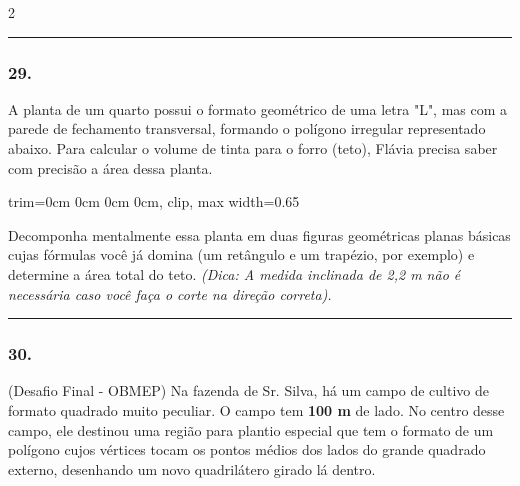 \documentclass[twoside, 10pt, a4paper]{article}
\newlength{\espacoPreQuestao}\setlength{\espacoPreQuestao}{0.1cm}
\newlength{\espacoQuestao}\setlength{\espacoQuestao}{0.2cm}
\begin{document}
\begin{multicols*}{2}
\noindent\textcolor{CorLinha}{\rule{\linewidth}{0.5pt}} 
\par\vspace{\espacoPreQuestao}
\subsubsection*{29.} A planta de um quarto possui o formato geométrico de uma letra "L", mas com a parede de fechamento transversal, formando o polígono irregular representado abaixo. Para calcular o volume de tinta para o forro (teto), Flávia precisa saber com precisão a área dessa planta.

\begin{center}
\begin{adjustbox}{trim=0cm 0cm 0cm 0cm, clip, max width=0.65\linewidth}
\end{adjustbox}
\end{center}

Decomponha mentalmente essa planta em duas figuras geométricas planas básicas cujas fórmulas você já domina (um retângulo e um trapézio, por exemplo) e determine a área total do teto. \textit{(Dica: A medida inclinada de 2,2 m não é necessária caso você faça o corte na direção correta).}
\par\vspace{\espacoQuestao}

\noindent\textcolor{CorLinha}{\rule{\linewidth}{0.5pt}} 
\par\vspace{\espacoPreQuestao}
\subsubsection*{30.} (Desafio Final - OBMEP) Na fazenda de Sr. Silva, há um campo de cultivo de formato quadrado muito peculiar. O campo tem \textbf{100 m} de lado. No centro desse campo, ele destinou uma região para plantio especial que tem o formato de um polígono cujos vértices tocam os pontos médios dos lados do grande quadrado externo, desenhando um novo quadrilátero girado lá dentro.


\end{multicols*}
\end{document}
